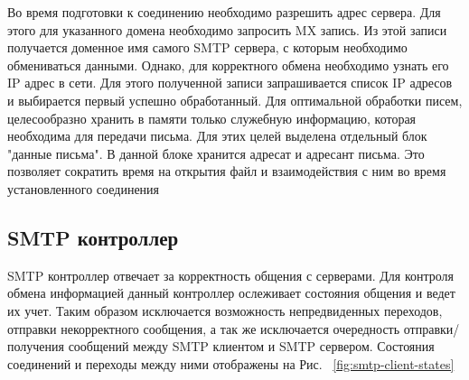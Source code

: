 \documentclass[a4paper,12pt]{report}
\begin{document}
Во время подготовки к соединению необходимо разрешить адрес сервера. Для этого для указанного домена необходимо запросить MX запись. Из этой записи получается доменное имя самого SMTP сервера, с которым необходимо обмениваться данными. Однако, для корректного обмена необходимо узнать его IP адрес в сети. Для этого полученной записи запрашивается список IP адресов и выбирается первый успешно обработанный. 
Для оптимальной обработки писем, целесообразно хранить в памяти только служебную информацию, которая необходима для передачи письма. Для этих целей выделена отдельный блок "данные письма". В данной блоке хранится адресат и адресант письма. Это позволяет сократить время на открытия файл и взаимодействия с ним во время установленного соединения

\subsection*{SMTP контроллер}
SMTP контроллер отвечает за корректность общения с серверами. Для контроля обмена информацией данный контроллер ослеживает состояния общения и ведет их учет. Таким образом исключается возможность непредвиденных переходов, отправки некорректного сообщения, а так же исключается очередность отправки/получения сообщений между SMTP клиентом и SMTP сервером. Состояния соединений и переходы между ними отображены на Рис. ~\ref{fig:smtp-client-states}
\end{document}
